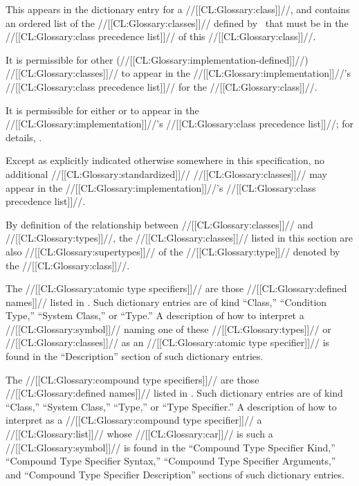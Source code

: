
This appears in the dictionary entry for a //[[CL:Glossary:class]]//, and contains an ordered list of the //[[CL:Glossary:classes]]// defined  by \clisp\ that must be in the //[[CL:Glossary:class precedence list]]// of this //[[CL:Glossary:class]]//.

It is permissible for other (//[[CL:Glossary:implementation-defined]]//) //[[CL:Glossary:classes]]// to appear in the //[[CL:Glossary:implementation]]//'s //[[CL:Glossary:class precedence list]]// for the //[[CL:Glossary:class]]//.

It is permissible for 
  either 
      or  to appear in the //[[CL:Glossary:implementation]]//'s //[[CL:Glossary:class precedence list]]//; for details, \seesection\TypeRelationships.

Except as explicitly indicated otherwise somewhere in this specification, no additional //[[CL:Glossary:standardized]]// //[[CL:Glossary:classes]]// may appear in  the //[[CL:Glossary:implementation]]//'s //[[CL:Glossary:class precedence list]]//.

By definition of the relationship between //[[CL:Glossary:classes]]// and //[[CL:Glossary:types]]//, the //[[CL:Glossary:classes]]// listed in this section are also //[[CL:Glossary:supertypes]]// of  the //[[CL:Glossary:type]]// denoted by the //[[CL:Glossary:class]]//.

\endsubsubsection%

 

The //[[CL:Glossary:atomic type specifiers]]// are those //[[CL:Glossary:defined names]]//  listed in \figref\StandardizedAtomicTypeSpecs. Such dictionary entries are of kind  ``Class,'' ``Condition Type,'' ``System Class,'' or ``Type.'' A description of how to interpret  a //[[CL:Glossary:symbol]]// naming one of these //[[CL:Glossary:types]]// or //[[CL:Glossary:classes]]//  as an //[[CL:Glossary:atomic type specifier]]// is found in the ``Description'' section of such dictionary entries.

The //[[CL:Glossary:compound type specifiers]]// are those //[[CL:Glossary:defined names]]//  listed in \figref\StandardizedCompoundTypeSpecNames. Such dictionary entries are of kind ``Class,'' ``System Class,'' ``Type,'' or ``Type Specifier.'' A description of how to interpret as a //[[CL:Glossary:compound type specifier]]// a //[[CL:Glossary:list]]// whose //[[CL:Glossary:car]]// is such a //[[CL:Glossary:symbol]]// is found in the 
     ``Compound Type Specifier Kind,''
     ``Compound Type Specifier Syntax,''
     ``Compound Type Specifier Arguments,''
 and ``Compound Type Specifier Description'' sections of such dictionary entries.

